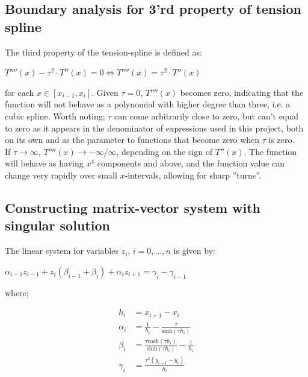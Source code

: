 \documentclass{article}
\newcommand{\T}[2]{\textbf{Task #1} -- #2:\\}
\begin{document}
  \subsection*{Boundary analysis for 3'rd property of tension spline}


  The third property of the tension-spline is defined as:

  \begin{center}
  $
    T''''(x) - \tau^2 \cdot T''(x) = 0 \iff
    T''''(x) = \tau^2 \cdot T''(x)
  $
  \end{center}

  for each $ x \in [x_{i-1},x_i]$. Given $ \tau = 0 $, $T''''(x)$ becomes zero,
  indicating that the function will not behave as a polynomial with higher
  degree than three, i.e. a cubic spline. Worth noting; $\tau$ can come
  arbitrarily close to zero, but can't equal to zero as it appears in the
  denominator of expressions used in this project, both on its own and as the
  parameter to functions that become zero when $\tau$ is zero. \\

  If $\tau \rightarrow \infty$, $T''''(x) \rightarrow -\infty/\infty$,
  depending on the sign of $T''(x)$.
  The function will behave as having $x^4$ components and above, and the
  function value can change very rapidly over small $x$-intervals, allowing for
  sharp ''turns''.
  \\

  \subsection*{Constructing matrix-vector system with singular solution}

  The linear system for variables $z_i$, $i = 0,...,n$ is given by:
  \begin{center}
    $\alpha_{i-1}z_{i-1} + z_i(\beta_{i-1} + \beta_i) + \alpha_i z_{i+1} =
    \gamma_i - \gamma_{i-1}$
  \end{center}

  where;

  \begin{align*}
    h_i &= x_{i+1} - x_i \\
    \alpha_i &= \frac{1}{h_i} - \frac{\tau}{\mathrm{sinh}(\tau h_i)} \\
    \beta_i &= \frac{\tau \mathrm{cosh}(\tau h_i)}{\mathrm{sinh}(\tau h_i)} -
    \frac{1}{h_i} \\
    \gamma_i &= \frac{\tau^2(y_{i+1}-y_i)}{h_i}
  \end{align*}
\end{document}
